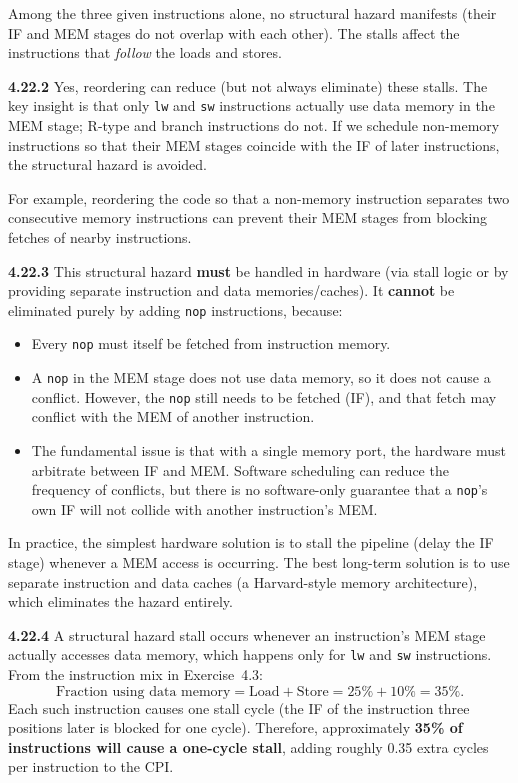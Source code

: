 Among the three given instructions alone, no structural hazard manifests
(their IF and MEM stages do not overlap with each other).  The stalls affect
the instructions that \emph{follow} the loads and stores.

\medskip\noindent\textbf{4.22.2}
Yes, reordering can reduce (but not always eliminate) these stalls.  The key
insight is that only \texttt{lw} and \texttt{sw} instructions actually use
data memory in the MEM stage; R-type and branch instructions do not.  If we
schedule non-memory instructions so that their MEM stages coincide with the
IF of later instructions, the structural hazard is avoided.

For example, reordering the code so that a non-memory instruction separates
two consecutive memory instructions can prevent their MEM stages from
blocking fetches of nearby instructions.

\medskip\noindent\textbf{4.22.3}
This structural hazard \textbf{must} be handled in hardware (via stall logic
or by providing separate instruction and data memories/caches).  It
\textbf{cannot} be eliminated purely by adding \texttt{nop} instructions,
because:
\begin{itemize}
  \item Every \texttt{nop} must itself be fetched from instruction memory.
  \item A \texttt{nop} in the MEM stage does not use data memory, so it does
        not cause a conflict.  However, the \texttt{nop} still needs to be
        fetched (IF), and that fetch may conflict with the MEM of another
        instruction.
  \item The fundamental issue is that with a single memory port, the hardware
        must arbitrate between IF and MEM.  Software scheduling can reduce the
        frequency of conflicts, but there is no software-only guarantee that a
        \texttt{nop}'s own IF will not collide with another instruction's MEM.
\end{itemize}

In practice, the simplest hardware solution is to stall the pipeline (delay
the IF stage) whenever a MEM access is occurring.  The best long-term
solution is to use separate instruction and data caches (a Harvard-style
memory architecture), which eliminates the hazard entirely.

\medskip\noindent\textbf{4.22.4}
A structural hazard stall occurs whenever an instruction's MEM stage actually
accesses data memory, which happens only for \texttt{lw} and \texttt{sw}
instructions.  From the instruction mix in Exercise~4.3:
\[
  \text{Fraction using data memory} = \text{Load} + \text{Store}
    = 25\% + 10\% = 35\%.
\]
Each such instruction causes one stall cycle (the IF of the instruction
three positions later is blocked for one cycle).  Therefore, approximately
\textbf{35\% of instructions will cause a one-cycle stall}, adding roughly
0.35 extra cycles per instruction to the CPI.

